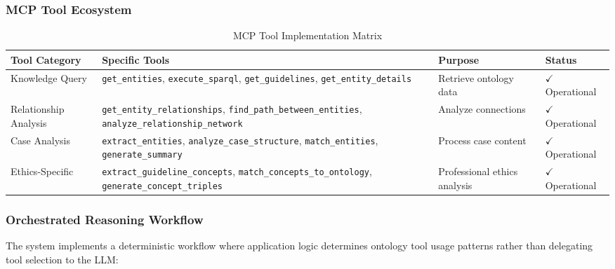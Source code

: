 \subsubsection{MCP Tool Ecosystem}

\begin{table}[htbp]
\caption{MCP Tool Implementation Matrix}
\label{tab:mcp-tools}
\centering
\begin{tabular}{|p{3cm}|p{5cm}|p{3cm}|p{2cm}|}
\hline
\textbf{Tool Category} & \textbf{Specific Tools} & \textbf{Purpose} & \textbf{Status} \\
\hline
Knowledge Query & \texttt{get\_entities}, \texttt{execute\_sparql}, \texttt{get\_guidelines}, \texttt{get\_entity\_details} & Retrieve ontology data & $\checkmark$ Operational \\
\hline
Relationship Analysis & \texttt{get\_entity\_relationships}, \texttt{find\_path\_between\_entities}, \texttt{analyze\_relationship\_network} & Analyze connections & $\checkmark$ Operational \\
\hline
Case Analysis & \texttt{extract\_entities}, \texttt{analyze\_case\_structure}, \texttt{match\_entities}, \texttt{generate\_summary} & Process case content & $\checkmark$ Operational \\
\hline
Ethics-Specific & \texttt{extract\_guideline\_concepts}, \texttt{match\_concepts\_to\_ontology}, \texttt{generate\_concept\_triples} & Professional ethics analysis & $\checkmark$ Operational \\
\hline
\end{tabular}
\end{table}

\subsubsection{Orchestrated Reasoning Workflow}

The system implements a deterministic workflow where application logic determines ontology tool usage patterns rather than delegating tool selection to the LLM:

